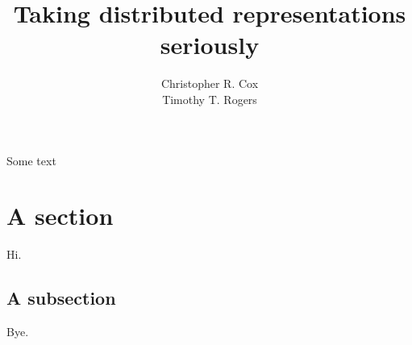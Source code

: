 \documentclass[12pt,man,draftfirst,apacite]{apa6}
\title{Taking distributed representations seriously}
\author{Christopher R. Cox\\Timothy T. Rogers}
\affiliation{University of Wisconsin, Madison}
\begin{document}
\maketitle

Some text

\section{A section}
Hi.

\subsection{A subsection}
Bye.
\end{document}
